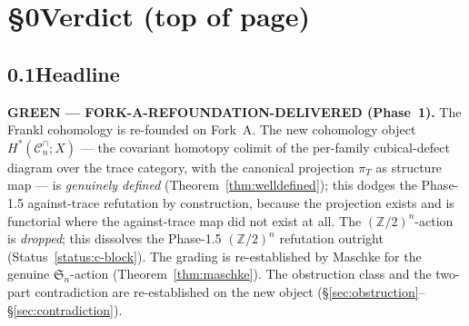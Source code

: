 \documentclass[11pt,oneside]{amsart}
\theoremstyle{plain}
\theoremstyle{definition}
\theoremstyle{remark}
\theoremstyle{honeststyle}
\newcommand{\Sym}{\mathfrak{S}}
\newcommand{\Z}{\mathbb{Z}}
\newcommand{\Cn}{\mathcal{C}^{\cap}_n}
\begin{document}
\maketitle

\tableofcontents

\section*{\S0\quad Verdict (top of page)}

\subsection*{0.1\quad Headline}

\noindent\textbf{GREEN --- FORK-A-REFOUNDATION-DELIVERED (Phase~1).}
The Frankl cohomology is re-founded on Fork~A. The new cohomology
object $H^{*}(\Cn;X)$ --- the covariant homotopy colimit of the
per-family cubical-defect diagram over the trace category, with the
canonical projection $\pi_T$ as structure map --- is \emph{genuinely
defined} (Theorem~\ref{thm:welldefined}); this dodges the Phase-1.5
against-trace refutation by construction, because the projection
exists and is functorial where the against-trace map did not exist at
all. The $(\Z/2)^n$-action is \emph{dropped}; this dissolves the
Phase-1.5 $(\Z/2)^n$ refutation outright (Status~\ref{status:c-block}).
The grading is re-established by Maschke for the genuine
$\Sym_n$-action (Theorem~\ref{thm:maschke}). The obstruction class and
the two-part contradiction are re-established on the new object
(\S\ref{sec:obstruction}--\S\ref{sec:contradiction}).
\end{document}

